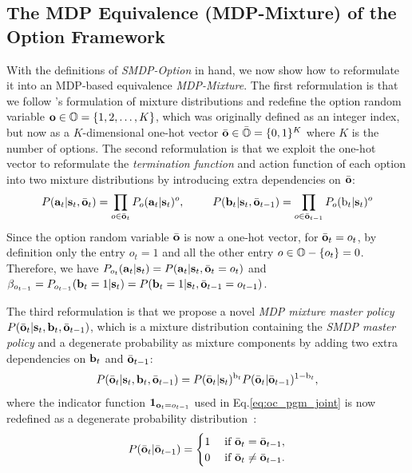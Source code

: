 \documentclass{article}
\begin{document}
\subsection{The MDP Equivalence (MDP-Mixture) of the Option
  Framework}
\label{sec:mdp_option}
With the definitions of \emph{SMDP-Option} in hand, we now show
how to reformulate it into an MDP-based equivalence
\emph{MDP-Mixture}. The first reformulation is that we follow
's formulation of mixture
distributions and redefine the option random variable
${\mathbf{o}}\in{\mathbb{O}}=\{1,2,\dots,K\}$, which was originally defined as an
integer index, but now as a $K$-dimensional one-hot vector
$\bar{{\mathbf{o}}}\in\bar{{\mathbb{O}}}=\{0,1\}^K$ where $K$ is the number of
options. The second reformulation is that we exploit the one-hot
vector to reformulate the \emph{termination function} and action
function of each option into two mixture distributions by
introducing extra dependencies on $\bar{{\mathbf{o}}}$:
\begin{align}
  \label{eq:mdp_action_termination}
P({\mathbf{a}}_t|{\mathbf{s}}_t,\bar{{\mathbf{o}}}_t) =
\prod_{o\in\bar{{\mathbf{o}}}_t}P_{o}({\mathbf{a}}_t|{\mathbf{s}}_t)^{o},\;\;\;\;\;\;\;\;\;
P({\mathbf{b}}_t|{\mathbf{s}}_t,\bar{{\mathbf{o}}}_{t-1}) =
\prod_{o\in\bar{{\mathbf{o}}}_{t-1}}P_{o}({\textnormal{b}}_t|{\mathbf{s}}_t)^{o}
\end{align}
Since the option random variable $\bar{{\mathbf{o}}}$ is now a one-hot
vector, for $\bar{{\mathbf{o}}}_t=o_t$, by definition only the entry
$o_t=1$ and all the other entry $o\in{\mathbb{O}}-\{o_t\}=0$. Therefore,
we have
$P_{o_t}({\mathbf{a}}_t|{\mathbf{s}}_t)=P({\mathbf{a}}_t|{\mathbf{s}}_t,\bar{{\mathbf{o}}}_t=o_t)$ and
$\beta_{o_{t-1}}=P_{o_{t-1}}({\mathbf{b}}_t=1|{\mathbf{s}}_t)=P({\mathbf{b}}_t=1|{\mathbf{s}}_t,\bar{{\mathbf{o}}}_{t-1}=o_{t-1})$.

The third reformulation is that we propose a novel \emph{MDP
  mixture master policy}
$P(\bar{{\mathbf{o}}}_t|{\mathbf{s}}_t,{\mathbf{b}}_t,\bar{{\mathbf{o}}}_{t-1})$, which is a
mixture distribution containing the \emph{SMDP master policy} and
a degenerate probability as mixture components by adding two
extra dependencies on ${\mathbf{b}}_t$ and $\bar{{\mathbf{o}}}_{t-1}$:
\begin{equation}
  \label{eq:mdp_oc_po}
P(\bar{{\mathbf{o}}}_t|{\mathbf{s}}_t,{\mathbf{b}}_t,\bar{{\mathbf{o}}}_{t-1}) = P(\bar{{\mathbf{o}}}_t|{\mathbf{s}}_t)^{{\textnormal{b}}_t}P(\bar{{\mathbf{o}}}_t|\bar{{\mathbf{o}}}_{t-1})^{1-{\textnormal{b}}_t},
\end{equation}
where the indicator function $\bm{1}_{{\mathbf{o}}_t=o_{t-1}}$ used in
Eq.\ref{eq:oc_pgm_joint} is now redefined as a degenerate
probability distribution~\cite{puterman2014markov}:
\begin{equation*}
  \label{eq:deg_puterman}
P(\bar{{\mathbf{o}}}_t|\bar{{\mathbf{o}}}_{t-1}) = 
\begin{cases}
  1&\;\text{if } \bar{{\mathbf{o}}}_t=\bar{{\mathbf{o}}}_{t-1},\\
  0&\;\text{if } \bar{{\mathbf{o}}}_t\neq\bar{{\mathbf{o}}}_{t-1}.
\end{cases}
\end{equation*}
\end{document}
